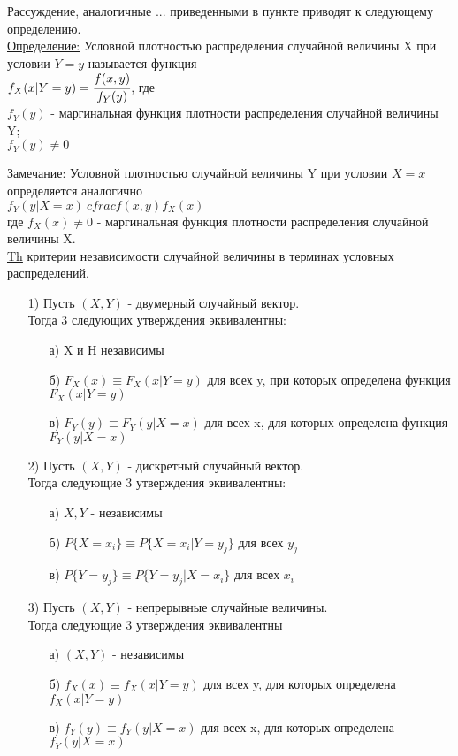 Рассуждение, аналогичные ... приведенными в пункте  приводят к следующему определению. \\
\underline{Определение:} Условной плотностью распределения случайной величины X при условии $Y = y$ называется функция \\
$f_X(x|Y = y) = \cfrac{f(x,y)}{f_Y(y)}$, где \\
$f_Y(y)$ - маргинальная функция плотности распределения случайной величины Y; \\
$f_Y(y) \neq 0$


\underline{Замечание:} Условной плотностью случайной величины Y при условии $X = x$ определяется аналогично \\
$f_Y(y|X = x) \ cfrac{f(x,y)}{f_X(x)}$ \\
где $f_X(x) \neq 0$ - маргинальная функция плотности распределения случайной величины X. \\


\underline{Th} критерии независимости случайной величины в терминах условных распределений.
\begin{enumerate}
\item[1)] Пусть $(X,Y)$ - двумерный случайный вектор. \\
Тогда 3 следующих утверждения эквивалентны: \\
	\begin{enumerate}
	\item[а)] X и Н независимы
	\item[б)] $F_X(x) \equiv F_X(x|Y = y)$ для всех y, при которых определена функция $F_X(x|Y = y)$
	\item[в)] $F_Y(y) \equiv F_Y(y|X = x)$ для всех x, для которых определена функция $F_Y(y|X = x)$
	\end{enumerate}
	
\item[2)] Пусть $(X,Y)$ - дискретный случайный вектор. \\
Тогда следующие 3 утверждения эквивалентны: \\
	\begin{enumerate}
	\item[а)] $X,Y$ - независимы 
	\item[б)] $P\{X = x_i\} \equiv P\{X = x_i|Y = y_j\}$ для всех $y_j$
	\item[в)] $P\{Y = y_j\} \equiv P\{Y = y_j|X = x_i\}$ для всех $x_i$
	\end{enumerate}
	
\item[3)] Пусть $(X,Y)$ - непрерывные случайные величины. \\
Тогда следующие 3 утверждения эквивалентны \\
	\begin{enumerate}
	\item[а)] $(X,Y)$ - независимы
	\item[б)] $f_X(x) \equiv f_X(x|Y = y)$ для всех y, для которых определена $f_X(x|Y = y)$
	\item[в)] $f_Y(y) \equiv f_Y(y|X = x)$ для всех x, для которых определена $f_Y(y|X = x)$
	\end{enumerate}
\end{enumerate}


